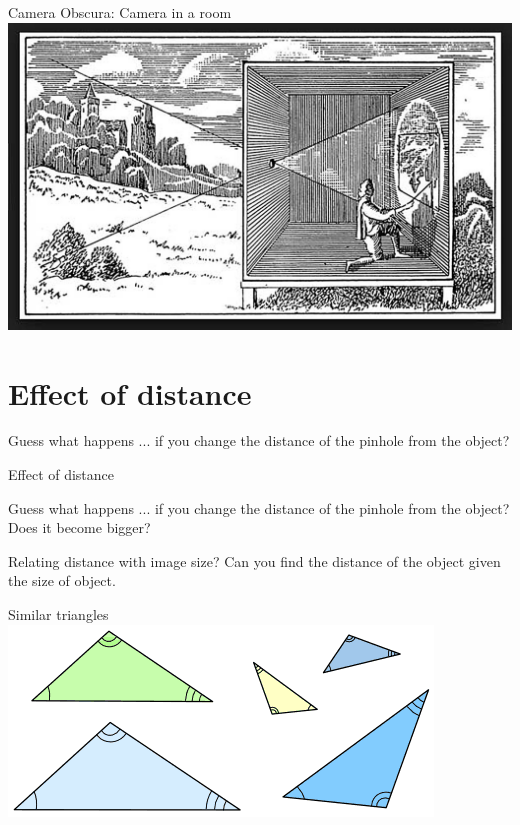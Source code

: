\begin{frame}{Camera Obscura: Camera in a room}
  \centering
  \includegraphics[width=\textwidth]{media/camera_ina_room.jpg}
\end{frame}

\section{Effect of distance}
\begin{frame}{Guess what happens}
  ... if you change the distance of the pinhole from the object?
\end{frame}

\begin{frame}[fragile]{Effect of distance}
  
\end{frame}

\begin{frame}{Guess what happens}
  ... if you change the distance of the pinhole from the object?\\
  \pause
  {\color{red} Does it become bigger?}
\end{frame}

\begin{frame}{Relating distance with image size?}
  Can you find the distance of the object given the size of object.
\end{frame}

\begin{frame}{Similar triangles}
  \includegraphics[width=\textwidth]{media/tri-similar1.png}
\end{frame}


